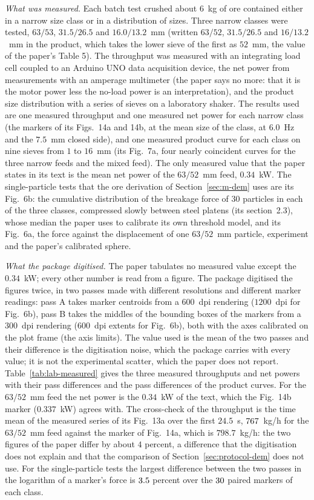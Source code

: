 \emph{What was measured.} Each batch test crushed about $6$~kg of ore contained either in a narrow size class or in a distribution of sizes. Three narrow classes were tested, $63/53$, $31.5/26.5$ and $16.0/13.2$~mm (written $63/52$, $31.5/26.5$ and $16/13.2$~mm in the product, which takes the lower sieve of the first as $52$~mm, the value of the paper's Table 5). The throughput was measured with an integrating load cell coupled to an Arduino UNO data acquisition device, the net power from measurements with an amperage multimeter (the paper says no more: that it is the motor power less the no-load power is an interpretation), and the product size distribution with a series of sieves on a laboratory shaker. The results used are one measured throughput and one measured net power for each narrow class (the markers of its Figs.~14a and 14b, at the mean size of the class, at $6.0$~Hz and the $7.5$~mm closed side), and one measured product curve for each class on nine sieves from $1$ to $16$~mm (its Fig.~7a, four nearly coincident curves for the three narrow feeds and the mixed feed). The only measured value that the paper states in its text is the mean net power of the $63/52$~mm feed, $0.34$~kW. The single-particle tests that the ore derivation of Section~\ref{sec:m-dem} uses are its Fig.~6b: the cumulative distribution of the breakage force of $30$ particles in each of the three classes, compressed slowly between steel platens (its section~2.3), whose median the paper uses to calibrate its own threshold model, and its Fig.~6a, the force against the displacement of one $63/52$~mm particle, experiment and the paper's calibrated sphere.

\emph{What the package digitised.} The paper tabulates no measured value except the $0.34$~kW; every other number is read from a figure. The package digitised the figures twice, in two passes made with different resolutions and different marker readings: pass A takes marker centroids from a $600$~dpi rendering ($1200$~dpi for Fig.~6b), pass B takes the middles of the bounding boxes of the markers from a $300$~dpi rendering ($600$~dpi extents for Fig.~6b), both with the axes calibrated on the plot frame (the axis limits). The value used is the mean of the two passes and their difference is the digitisation noise, which the package carries with every value; it is not the experimental scatter, which the paper does not report. Table~\ref{tab:lab-measured} gives the three measured throughputs and net powers with their pass differences and the pass differences of the product curves. For the $63/52$~mm feed the net power is the $0.34$~kW of the text, which the Fig.~14b marker ($0.337$~kW) agrees with. The cross-check of the throughput is the time mean of the measured series of its Fig.~13a over the first $24.5$~s, $767$~kg/h for the $63/52$~mm feed against the marker of Fig.~14a, which is $798.7$~kg/h: the two figures of the paper differ by about $4$ percent, a difference that the digitisation does not explain and that the comparison of Section~\ref{sec:protocol-dem} does not use. For the single-particle tests the largest difference between the two passes in the logarithm of a marker's force is $3.5$ percent over the $30$ paired markers of each class.

